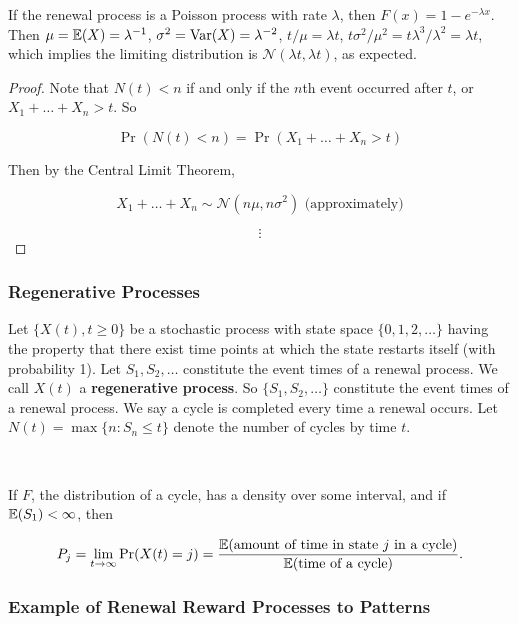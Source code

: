 \begin{remark}If the renewal process is a Poisson process with rate \(\lambda\), then \(F(x) = 1 - e^{-\lambda x}\). Then \(\mu = \E(X) = \lambda^{-1}\), \(\sigma^2 = \Var(X) = \lambda^{-2}\), \(t/\mu = \lambda t\), \(t \sigma^2/\mu^2 = t \lambda^3/\lambda^2 = \lambda t\), which implies the limiting distribution is \(\mathcal{N}(\lambda t, \lambda t)\), as expected.

\end{remark}


\begin{proof} Note that \(N(t) < n \) if and only if the \(n\)th event occurred after \(t\), or \(X_1 + \ldots + X_n > t\). So

\[
\Pr(N(t) < n) = \Pr(X_1 + \ldots + X_n > t) 
\]

Then by the Central Limit Theorem, 

\[
X_1 + \ldots + X_n \sim \mathcal{N}(n \mu, n \sigma^2) \text{ (approximately)}
\]

\[
\vdots
\]

\end{proof}

\subsubsection{Regenerative Processes}

\begin{theorem} Let \(\{X(t), t \geq 0\}\) be a stochastic process with state space \(\{0, 1, 2, \ldots\}\) having the property that there exist time points at which the state restarts itself (with probability 1). Let \(S_1, S_2, \ldots\) constitute the event times of a renewal process. We call \(X(t)\) a \textbf{regenerative process}. So \(\{S_1, S_2, \ldots \}\) constitute the event times of a renewal process. We say a cycle is completed every time a renewal occurs. Let \(N(t) = \max \{n: S_n \leq t\}\) denote the number of cycles by time \(t\).

\

If \(F\), the distribution of a cycle, has a density over some interval, and if \(\E(S_1) < \infty\), then

\[
P_j = \lim_{t \to \infty} \Pr(X(t) = j) = \frac{\E(\text{amount of time in state } j \text{ in a cycle})}{\E(\text{time of a cycle})}.
\]

\end{theorem}

\subsubsection{Example of Renewal Reward Processes to Patterns}

